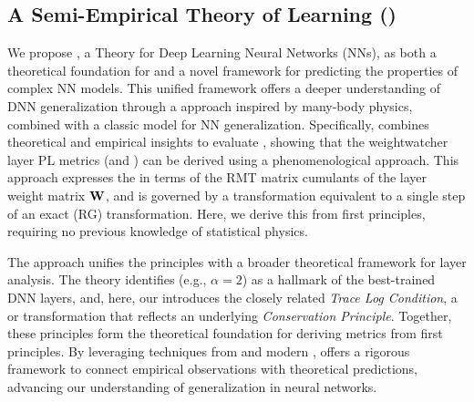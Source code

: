 \subsection{A Semi-Empirical Theory of Learning (\SETOL)}

We propose \SETOL, a \SemiEmpirical Theory for Deep Learning Neural Networks (NNs),
as both a theoretical foundation for \HTSR \Phenomenology
and a novel framework for predicting the properties of complex NN models.
This unified framework offers a deeper understanding of DNN generalization
through a \SemiEmpirical approach inspired by many-body physics,
combined with a classic \STATMECH model for NN generalization.
Specifically, \SETOL combines theoretical and empirical insights to evaluate \ModelQuality,
showing that the weightwatcher layer \HTSR PL metrics (\ALPHA and \ALPHAHAT)
can be derived using a phenomenological \EffectiveHamiltonian approach.
This approach expresses the \HTSR \LayerQuality in terms of the RMT matrix cumulants
of the layer weight matrix ${\mathbf{W}}$,
and is governed by a \ScaleInvariant transformation equivalent
to a single step of an exact \RenormalizationGroup (RG) transformation.
Here, we derive this from first principles, requiring no previous knowledge of statistical physics.

The \SETOL approach unifies the \HTSR principles with
a broader theoretical framework for layer analysis.
The \HTSR theory identifies \Universality (e.g., $\alpha=2$) as a hallmark of the best-trained DNN layers,
and, here, our \SETOL introduces the closely related \emph{Trace Log Condition}, a \ScaleInvariant or
\VolumePreserving transformation that reflects an underlying \emph{Conservation Principle}.
Together, these principles form the theoretical foundation for deriving \HTSR \LayerQuality metrics from first principles.
By leveraging techniques from \STATMECH and modern \RMT, \SETOL offers a rigorous framework
to connect empirical observations with theoretical predictions, advancing our understanding of generalization
in neural networks.

